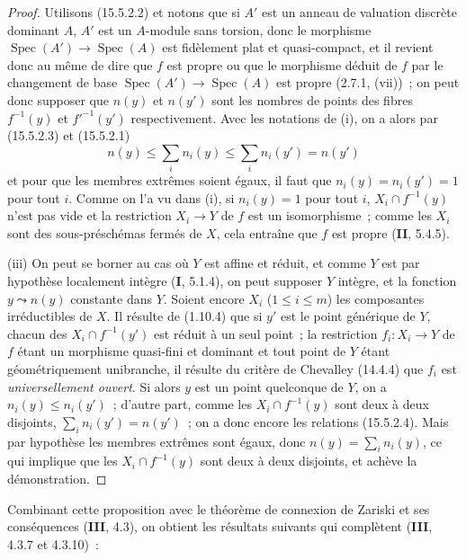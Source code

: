 \begin{proof}
Utilisons (15.5.2.2) et notons que si $A'$ est un anneau de valuation discrète dominant $A$, $A'$ est un $A$-module sans torsion, donc le morphisme $\operatorname{Spec}(A')\to\operatorname{Spec}(A)$ est fidèlement plat et quasi-compact, et il revient donc au même de dire que $f$ est propre ou que le morphisme déduit de $f$ par le changement de base $\operatorname{Spec}(A')\to\operatorname{Spec}(A)$ est
propre (2.7.1, (vii))~; on peut donc supposer que $n(y)$ et $n(y')$ sont les nombres de points des fibres $f^{-1}(y)$ et $f'^{-1}(y')$ respectivement. Avec les notations de (i), on a alors par (15.5.2.3) et (15.5.2.1)
\begin{equation}
\tag{15.5.2.4}
\label{IV.15.5.2.4-fr}
  n(y)\leqslant\sum_i n_i(y)\leqslant\sum_i n_i(y')=n(y')
\end{equation}
et pour que les membres extrêmes soient égaux, il faut que $n_i(y)=n_i(y')=1$ pour tout $i$. Comme on l'a vu dans (i), si $n_i(y)=1$ pour tout $i$, $X_i\cap f^{-1}(y)$ n'est pas vide et la restriction $X_i\to Y$ de $f$ est un isomorphisme~; comme les $X_i$ sont des sous-préschémas fermés de $X$, cela entraîne que $f$ est propre (\textbf{II}, 5.4.5).

(iii) On peut se borner au cas où $Y$ est affine et réduit, et comme $Y$ est par hypothèse localement intègre (\textbf{I}, 5.1.4), on peut supposer $Y$ intègre, et la fonction $y\leadsto n(y)$ constante dans $Y$. Soient encore $X_i$ ($1\leqslant i\leqslant m$) les composantes irréductibles de $X$. Il résulte de (1.10.4) que si $y'$ est le point générique de $Y$, chacun des $X_i\cap f^{-1}(y')$ est réduit à un seul point~; la restriction $f_i:X_i\to Y$ de $f$ étant un morphisme quasi-fini et dominant et tout point de $Y$ étant géométriquement unibranche, il résulte du critère de Chevalley (14.4.4) que $f_i$ est \emph{universellement ouvert}. Si alors $y$ est un point quelconque de $Y$, on a $n_i(y)\leqslant n_i(y')$~; d'autre part, comme les $X_i\cap f^{-1}(y)$ sont deux à deux disjoints, $\sum_i n_i(y')=n(y')$~; on a donc encore les relations (15.5.2.4). Mais par hypothèse les membres extrêmes sont égaux, donc $n(y)=\sum_i n_i(y)$, ce qui implique que les $X_i\cap f^{-1}(y)$ sont deux à deux disjoints, et achève la démonstration.
\end{proof}

Combinant cette proposition avec le théorème de connexion de Zariski et ses conséquences (\textbf{III}, 4.3), on obtient les résultats suivants qui complètent (\textbf{III}, 4.3.7 et 4.3.10)~:

